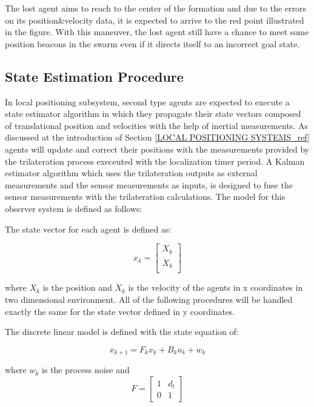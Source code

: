 The lost agent aims to reach to the center of the formation and due to the errors on its position$\&$velocity data, it is expected to arrive to the red point illustrated in the figure. With this maneuver, the lost agent still have a chance to meet some position beacons in the swarm even if it directs itself to an incorrect goal state.
	
\subsection{State Estimation Procedure} \label{StateEstimationref}
In local positioning subsystem, second type agents are expected to execute a state estimator algorithm in which they propagate their state vectors composed of translational position and velocities with the help of inertial measurements. As discussed at the introduction of Section \ref{LOCAL POSITIONING SYSTEMS_ref} agents will update and correct their positions with the measurements provided by the trilateration process execeuted with the localization timer period. A Kalman estimator algorithm which uses the trilateration outputs as external measurements and the sensor measurements as inputs, is designed to fuse the sensor measurements with the trilateration calculations. The model for this observer system is defined as follows:
	
The state vector for each agent is defined as:

\begin{equation}
x_k = \begin{bmatrix}
X_k \\
\dot{X}_k\\
\end{bmatrix}
\end{equation}
	
where $X_k$ is the position and $\dot{X}_k$ is the velocity of the agents in x coordinates in two dimensional environment. All of the following procedures will be handled exactly the same for the state vector defined in y coordinates.

The discrete linear model is defined with the state equation of:

\begin{equation}
x_{k+1} = F_k     x_{k} + B_ku_k + w_k
\end{equation}
	
where $w_k$ is the process noise and 
\begin{equation}
F = \begin{bmatrix}
1 & d_t\\
0 & 1
\end{bmatrix}   
\end{equation}
	
